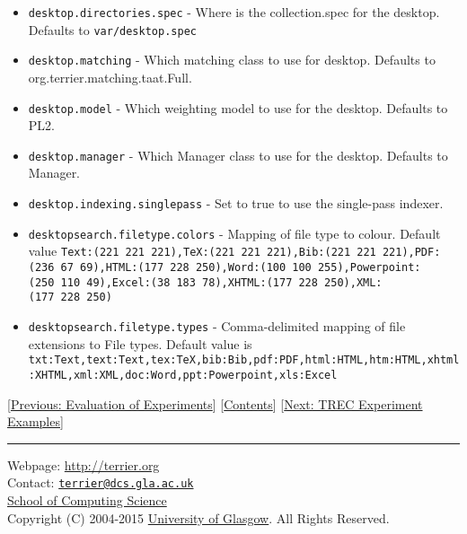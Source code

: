 \begin{itemize}
\tightlist
\item
  \texttt{desktop.directories.spec} - Where is the collection.spec for
  the desktop. Defaults to \texttt{var/desktop.spec}
\item
  \texttt{desktop.matching} - Which matching class to use for desktop.
  Defaults to org.terrier.matching.taat.Full.
\item
  \texttt{desktop.model} - Which weighting model to use for the desktop.
  Defaults to PL2.
\item
  \texttt{desktop.manager} - Which Manager class to use for the desktop.
  Defaults to Manager.
\item
  \texttt{desktop.indexing.singlepass} - Set to true to use the
  single-pass indexer.
\item
  \texttt{desktopsearch.filetype.colors} - Mapping of file type to
  colour. Default value
  \texttt{Text:(221\ 221\ 221),TeX:(221\ 221\ 221),Bib:(221\ 221\ 221),PDF:(236\ 67\ 69),HTML:(177\ 228\ 250),Word:(100\ 100\ 255),Powerpoint:(250\ 110\ 49),Excel:(38\ 183\ 78),XHTML:(177\ 228\ 250),XML:(177\ 228\ 250)}
\item
  \texttt{desktopsearch.filetype.types} - Comma-delimited mapping of
  file extensions to File types. Default value is
  \texttt{txt:Text,text:Text,tex:TeX,bib:Bib,pdf:PDF,html:HTML,htm:HTML,xhtml:XHTML,xml:XML,doc:Word,ppt:Powerpoint,xls:Excel}
\end{itemize}

{[}\href{evaluation.html}{Previous: Evaluation of Experiments}{]}
{[}\href{index.html}{Contents}{]} {[}\href{trec_examples.html}{Next:
TREC Experiment Examples}{]}

\begin{center}\rule{0.5\linewidth}{\linethickness}\end{center}

Webpage: \url{http://terrier.org}\\
Contact:
\href{mailto:terrier@dcs.gla.ac.uk}{\nolinkurl{terrier@dcs.gla.ac.uk}}\\
\href{http://www.dcs.gla.ac.uk/}{School of Computing Science}\\
Copyright (C) 2004-2015 \href{http://www.gla.ac.uk/}{University of
Glasgow}. All Rights Reserved.
